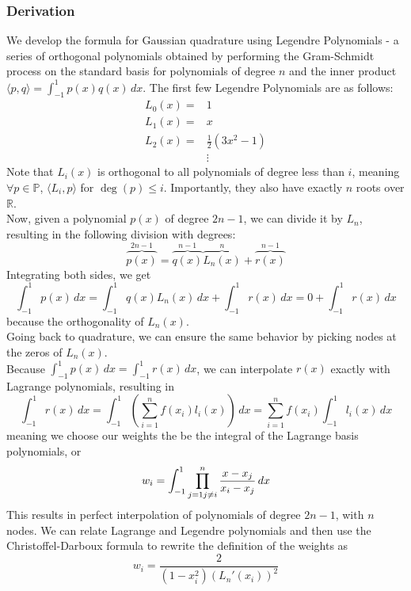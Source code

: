 \documentclass[12pt]{article}
\begin{document}
\subsubsection{Derivation}

We develop the formula for Gaussian quadrature using Legendre Polynomials - a series of orthogonal polynomials obtained by performing the Gram-Schmidt process
on the standard basis for polynomials of degree $n$ and the inner product $\langle p,q \rangle = \int_{-1}^{1} p(x)q(x)\,dx$.
The first few Legendre Polynomials are as follows:
\begin{align*}
	L_{0}(x)= & 1                     \\
	L_{1}(x)= & x                     \\
	L_{2}(x)= & \frac{1}{2}(3x^{2}-1) \\
	          & \vdots
\end{align*}
Note that $L_i(x)$ is orthogonal to all polynomials of degree less than $i$, meaning $\forall p \in \mathbb{P}$, $\langle L_i, p \rangle$ for $\deg(p) \leq i$.
Importantly, they also have exactly $n$ roots over $\mathbb{R}$.\\

Now, given a polynomial $p(x)$ of degree $2n - 1$, we can divide it by $L_n$, resulting in the following division with degrees:
\begin{equation}
	\overbrace{p(x)}^{2n-1}=\overbrace{q(x)}^{n-1} \overbrace{L_{n}(x)}^{n}+\overbrace{r(x)}^{n-1}
\end{equation}
Integrating both sides, we get
\[
	\int_{-1}^{1}p(x) \,dx = \int_{-1}^{1}q(x) L_{n}(x)\,dx + \int_{-1}^{1}r(x)\,dx  = 0+\int_{-1}^{1}r(x) \,dx
\] because the orthogonality of $L_{n}(x)$. \\
Going back to quadrature, we can ensure the same behavior by picking nodes at the zeros of $L_{n}(x)$. \\
Because $\int_{-1}^{1} p(x)\,dx = \int_{-1}^{1}r(x)\,dx$, we can interpolate $r(x)$ exactly with Lagrange polynomials, resulting in
\[
	\int_{-1}^{1}r(x)\,dx = \int_{-1}^{1}\left( \sum_{i=1}^{n}f(x_{i})l_{i}(x)\right)\,dx = \sum_{i=1}^{n}f(x_{i})\int_{-1}^{1}l_{i}(x)\,dx
\]
meaning we choose our weights the be the integral of the Lagrange basis polynomials, or
\[
	w_{i}=\int_{-1}^{1}\prod_{{j=1 \\j \ne i}}^{n} \frac{x-x_{j}}{x_{i}-x_{j}}\,dx
\]
This results in perfect interpolation of polynomials of degree $2n-1$, with $n$ nodes.
We can relate Lagrange and Legendre polynomials and then use the Christoffel-Darboux formula to rewrite the definition of the weights as
\begin{equation}
	w_{i}=\frac{2}{(1-x_{i}^2)(L_{n}'(x_{i}))^{2}}
\end{equation}
\end{document}
